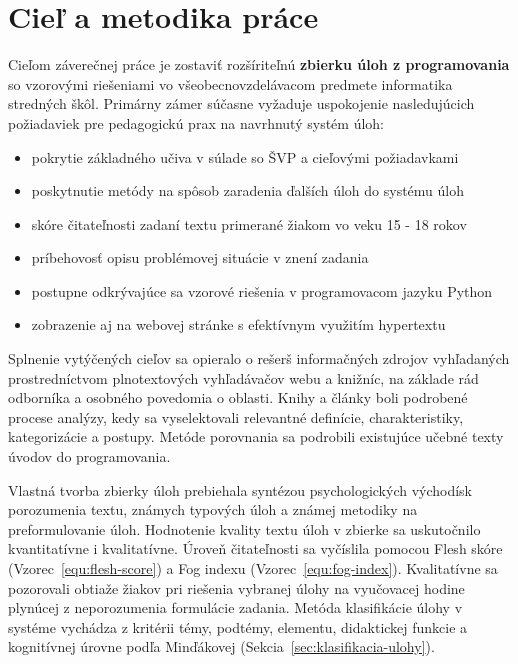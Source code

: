 \chapter{Cieľ a metodika práce}
Cieľom záverečnej práce je zostaviť rozšíriteľnú \textbf{zbierku úloh z programovania} so vzorovými riešeniami vo všeobecnovzdelávacom predmete informatika stredných škôl. Primárny zámer súčasne vyžaduje uspokojenie nasledujúcich požiadaviek pre pedagogickú prax na navrhnutý systém úloh:

\begin{itemize}[noitemsep]
\item pokrytie základného učiva v súlade so ŠVP a cieľovými požiadavkami 
\item poskytnutie metódy na spôsob zaradenia ďalších úloh do systému úloh
\item skóre čitateľnosti zadaní textu primerané žiakom vo veku 15 - 18 rokov
\item príbehovosť opisu problémovej situácie v znení zadania
\item postupne odkrývajúce sa vzorové riešenia v programovacom jazyku Python
\item zobrazenie aj na webovej stránke s efektívnym využitím hypertextu
\end{itemize}

Splnenie vytýčených cieľov sa opieralo o rešerš informačných zdrojov vyhľadaných prostredníctvom plnotextových vyhľadávačov webu a knižníc, na základe rád odborníka a osobného povedomia o oblasti. Knihy a články boli podrobené procese analýzy, kedy sa vyselektovali relevantné definície, charakteristiky, kategorizácie a postupy. Metóde porovnania sa podrobili existujúce učebné texty úvodov do programovania. 

Vlastná tvorba zbierky úloh prebiehala syntézou psychologických východísk porozumenia textu, známych typových úloh a známej metodiky na preformulovanie úloh. Hodnotenie kvality textu úloh v zbierke sa uskutočnilo kvantitatívne i kvalitatívne. Úroveň čitateľnosti sa vyčíslila pomocou Flesh skóre (Vzorec~\ref{equ:flesh-score}) a Fog indexu (Vzorec~\ref{equ:fog-index}). Kvalitatívne sa pozorovali obtiaže žiakov pri riešenia vybranej úlohy na vyučovacej hodine plynúcej z neporozumenia formulácie zadania. Metóda klasifikácie úlohy v systéme vychádza z kritérii témy, podtémy, elementu, didaktickej funkcie a kognitívnej úrovne podľa Minďákovej (Sekcia~\ref{sec:klasifikacia-ulohy}).
